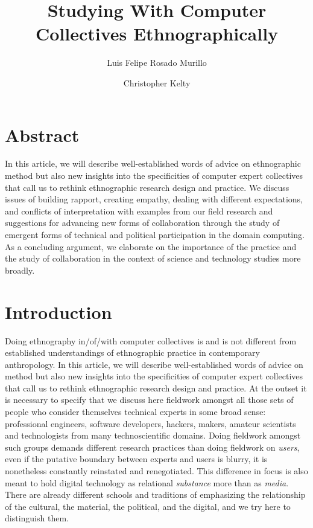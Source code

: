 \documentclass[10pt,letter,oneside]{scrartcl}
\author[1]{Luis Felipe Rosado Murillo}
\author[2]{Christopher Kelty}
\affil[1]{Berkman Center for Internet and Society, Harvard}
\affil[2]{UCLA Anthropology and Center for Society and Genetics}
\title{Studying With Computer Collectives Ethnographically}
\date{}
\begin{document}
\maketitle
\section{Abstract}
In this article, we will describe well-established words of advice 
on ethnographic method but also new insights into the specificities 
of computer expert collectives that call us to rethink ethnographic 
research design and practice. We discuss issues of building rapport, 
creating empathy, dealing with different expectations, and conflicts 
of interpretation with examples from our field research and suggestions
for advancing new forms of collaboration through the study of emergent 
forms of technical and political participation in the domain computing. 
As a concluding argument, we elaborate on the importance of the practice
and the study of collaboration in the context of science and technology 
studies more broadly.

\doublespacing
\section{Introduction}

Doing ethnography in/of/with computer collectives is and is not
different from established understandings of ethnographic practice in
contemporary anthropology. In this article, we will describe 
well-established words of advice on method but also new insights 
into the specificities of computer expert collectives that call us to
rethink ethnographic research design and practice.  At the outset it
is necessary to specify that we discuss here fieldwork amongst all
those sets of people who consider themselves technical experts in some
broad sense: professional engineers, software developers, hackers, 
makers, amateur scientists and technologists from many technoscientific
domains.  Doing fieldwork amongst such groups demands different research 
practices than doing fieldwork on \emph{users}, even if the putative 
boundary between experts and users is blurry, it is nonetheless constantly
reinstated and renegotiated.  This difference in focus is also meant to 
hold digital technology as relational \emph{substance} more than as \emph{media}.  
There are already different schools and traditions of emphasizing the 
relationship of the cultural, the material, the political, and the digital, 
and we try here to distinguish them.
\end{document}

